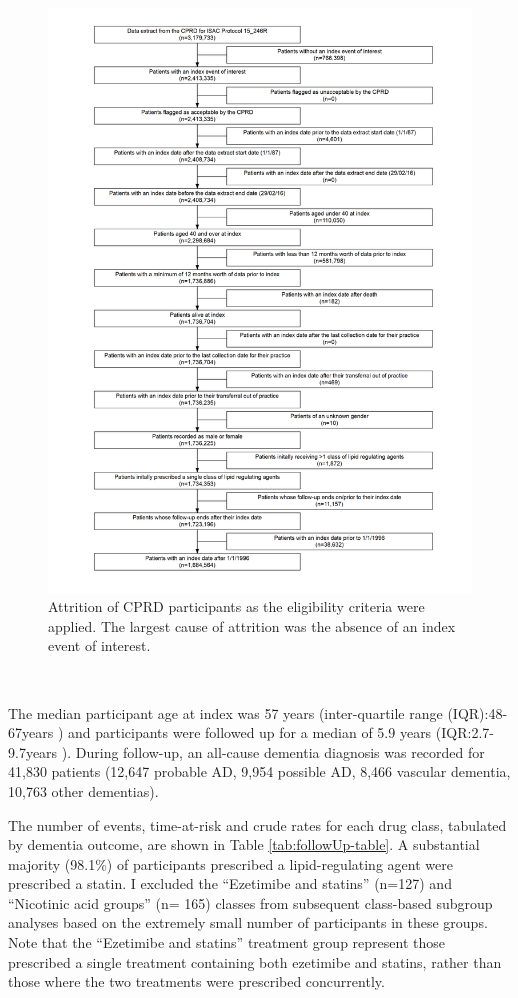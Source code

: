 \documentclass[a4paper, twoside]{templates/ociamthesis}
\begin{document}
\begin{figure}[H]
\includegraphics[width=1\linewidth]{figures/cprd-analysis/cohort_attrition} \caption[Attrition of CPRD participants]{Attrition of CPRD participants as the eligibility criteria were applied. The largest cause of attrition was the absence of an index event of interest.}\label{fig:cprdFlowchart}
\end{figure}

~

The median participant age at index was 57 years (inter-quartile range (IQR):48-67years ) and participants were followed up for a median of 5.9 years (IQR:2.7-9.7years ). During follow-up, an all-cause dementia diagnosis was recorded for 41,830 patients (12,647 probable AD, 9,954 possible AD, 8,466 vascular dementia, 10,763 other dementias).

The number of events, time-at-risk and crude rates for each drug class, tabulated by dementia outcome, are shown in Table \ref{tab:followUp-table}. A substantial majority (98.1\%) of participants prescribed a lipid-regulating agent were prescribed a statin. I excluded the ``Ezetimibe and statins'' (n=127) and ``Nicotinic acid groups'' (n= 165) classes from subsequent class-based subgroup analyses based on the extremely small number of participants in these groups. Note that the ``Ezetimibe and statins'' treatment group represent those prescribed a single treatment containing both ezetimibe and statins, rather than those where the two treatments were prescribed concurrently.
\end{document}
